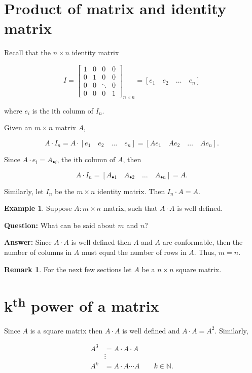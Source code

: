\documentclass[12pt]{article}
\theoremstyle{definition}
\newtheorem*{example}{Example}
\newtheorem*{remark}{Remark}
\begin{document}
\section{Product of matrix and identity matrix}

Recall that the $n \times n$ identity matrix

\[
I =
\begin{bmatrix}
1 & 0 & 0 & 0\\
0 & 1 & 0 & 0\\
0 & 0 & \ddots & 0 \\
0& 0 & 0 & 1
\end{bmatrix}_{n \times n}
=
[e_1 \quad e_2 \quad \ldots \quad e_n]
\]

where $e_i$ is the ith column of $I_n$.

Given an $m \times n$ matrix $A$,

\[
A \cdot I_n = A \cdot [e_1 \quad e_2 \quad \ldots \quad e_n] = [Ae_1 \quad Ae_2 \quad \ldots \quad Ae_n].
\]

Since $A \cdot e_i = A_{\bullet i}$, the ith column of $A$, then 

\[
A \cdot I_n = [A_{\bullet 1 } \quad A_{\bullet 2} \quad \ldots \quad A_{\bullet n}] = A.
\]

Similarly, let $I_n$ be the $m \times n$ identity matrix. Then $I_n \cdot A = A$.

\begin{example}
Suppose $A : m \times n$ matrix, such that $A \cdot A$ is well defined.

\textbf{Question:} What can be said about $m$ and $n$?

\textbf{Answer:} Since $A \cdot A$ is well defined then $A$ and $A$ are conformable, then
the number of columns in $A$ must equal the number of rows in $A$. Thus, $m = n$.
\end{example}

\begin{remark}
For the next few sections let $A$ be a $n \times n$ square matrix.
\end{remark}

\section{k\textsuperscript{th} power of a matrix}

Since $A$ is a square matrix then $A \cdot A$ is well defined and $A \cdot A = A^2$. Similarly,

\begin{align*}
A^3 &= A \cdot A \cdot A \\
&\vdots \\
A^k &= A \cdot A \cdots A \quad\quad k \in \mathbb{N}.
\end{align*}
\end{document}
